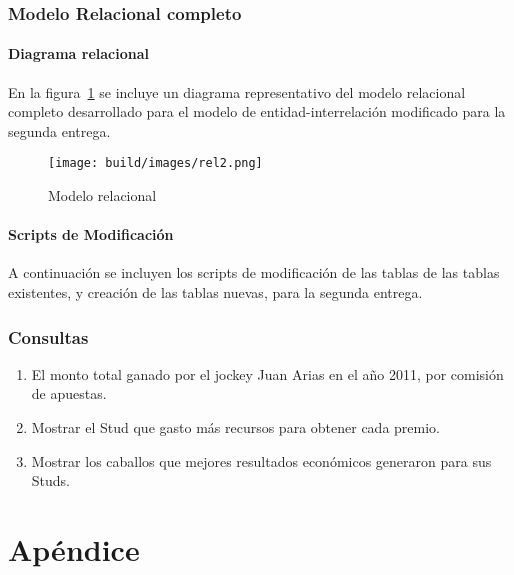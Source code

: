 \documentclass[a4paper,11pt]{article}
\begin{document}
\section{Modelo Relacional completo}

\subsection{Diagrama relacional}

En la figura~\ref{fig:rel2} se incluye un diagrama representativo del
modelo relacional completo desarrollado para el modelo de entidad-interrelación
modificado para la segunda entrega.

\begin{figure}[h!t]
  \centering
  \texttt{[image: build/images/rel2.png]}
  \caption{Modelo relacional} \label{fig:rel2}
\end{figure}

\FloatBarrier

\subsection{Scripts de Modificación}

A continuación se incluyen los scripts de modificación de las tablas de las tablas
existentes, y creación de las tablas nuevas, para la segunda entrega.



\clearpage

\section{Consultas}

\begin{enumerate}

  \item El monto total ganado por el jockey Juan Arias en el año 2011, por
    comisión de apuestas.

  \item Mostrar el Stud que gasto más recursos para obtener cada premio.

  \item Mostrar los caballos que mejores resultados económicos generaron
    para sus Studs.

\end{enumerate}


\part{Apéndice}
\appendix
\end{document}
